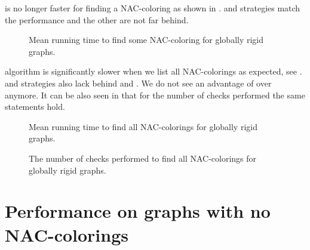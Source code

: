 \NaiveCycles{} is no longer faster for finding a NAC-coloring
as shown in .
\None{} and \Neighbors{} strategies match the performance and
the other are not far behind.
%
\begin{figure}[thbp]
	\centering
	\scalebox{\BenchFigureScale}{}
	\caption[Mean runtime for globally rigid graphs (some)]{
		Mean running time to find some NAC-coloring for globally rigid graphs.}%
	\label{fig:graph_globally_rigid_first_runtime}
\end{figure}%

\NaiveCycles{} algorithm is significantly slower when we list all NAC-colorings
as expected, see .
\None{} and \CycleMask{} strategies also lack behind \Neighbors{} and \NeighborsDegree{}.
We do not see an advantage of \MergeLinear{} over \SharedVertices{} anymore.
%
It can be also seen in 
that for the number of checks performed the same statements hold.
%
\begin{figure}[thbp]
	\centering
	\scalebox{\BenchFigureScale}{}
	\caption[Mean runtime for globally rigid graphs (all)]{
		Mean running time to find all NAC-colorings for globally rigid graphs.}%
	\label{fig:graph_globally_rigid_all_runtime}
\end{figure}%
\begin{figure}[thbp]
	\centering
	\scalebox{\BenchFigureScale}{}
	\caption[Checks performed for globally rigid graphs (all)]{
		The number of checks performed to find all NAC-colorings for globally rigid graphs.}%
	\label{fig:graph_globally_rigid_all_checks}
\end{figure}%



\section{Performance on graphs with no NAC-colorings}


